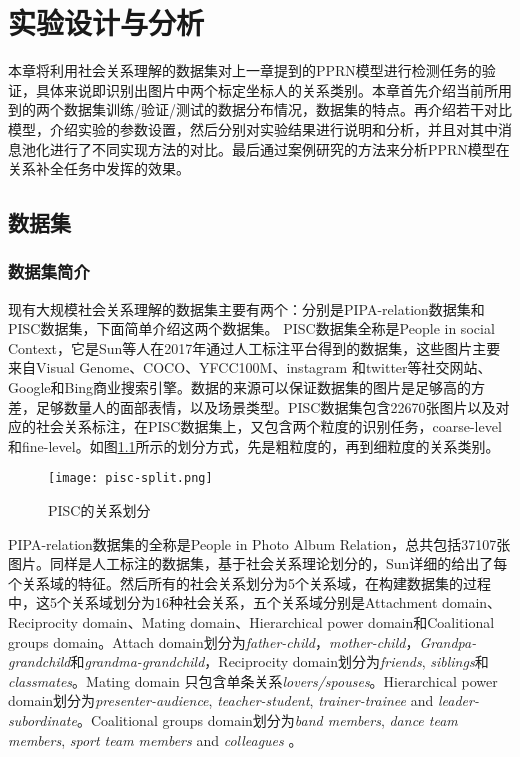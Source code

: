 
\chapter{实验设计与分析}
\label{ch:exp}

本章将利用社会关系理解的数据集对上一章提到的PPRN模型进行检测任务的验证，具体来说即识别出图片中两个标定坐标人的关系类别。本章首先介绍当前所用到的两个数据集训练/验证/测试的数据分布情况，数据集的特点。再介绍若干对比模型，介绍实验的参数设置，然后分别对实验结果进行说明和分析，并且对其中消息池化进行了不同实现方法的对比。最后通过案例研究的方法来分析PPRN模型在关系补全任务中发挥的效果。

\section{数据集}

\subsection{数据集简介}

现有大规模社会关系理解的数据集主要有两个：分别是PIPA-relation\cite{sun2017a}数据集和PISC\cite{li2017dual-glance}数据集，下面简单介绍这两个数据集。
PISC数据集全称是People in social Context，它是Sun等人\cite{sun2017a}在2017年通过人工标注平台得到的数据集，这些图片主要来自Visual Genome\cite{krishna2017visual}、COCO\cite{lin2014microsoft}、YFCC100M\cite{thomee2016yfcc100m:}、instagram 和twitter等社交网站、Google和Bing商业搜索引擎。数据的来源可以保证数据集的图片是足够高的方差，足够数量人的面部表情，以及场景类型。PISC数据集包含22670张图片以及对应的社会关系标注，在PISC数据集上，又包含两个粒度的识别任务，coarse-level和fine-level。如图\ref{fig:exp-pisc-r}所示的划分方式，先是粗粒度的，再到细粒度的关系类别。
\begin{figure}[htpb]
	\centering
	\texttt{[image: pisc-split.png]}
    \caption{PISC的关系划分}
	\vspace*{-3.5mm}
	\label{fig:exp-pisc-r}
\end{figure}

PIPA-relation数据集的全称是People in Photo Album Relation，总共包括37107张图片。同样是人工标注的数据集，基于社会关系理论划分的，Sun\cite{sun2017a}详细的给出了每个关系域的特征。然后所有的社会关系划分为5个关系域，在构建数据集的过程中，这5个关系域划分为16种社会关系，五个关系域分别是Attachment domain、Reciprocity domain、Mating domain、Hierarchical power domain和Coalitional groups domain。Attach domain划分为{\it father-child}，{\it mother-child}，{\it Grandpa-grandchild}和{\it grandma-grandchild}，Reciprocity domain划分为{\it friends}, {\it siblings}和{\it classmates}。Mating domain 只包含单条关系{\it lovers/spouses}。Hierarchical power domain划分为{\it presenter-audience}, {\it teacher-student}, {\it trainer-trainee} and {\it leader-subordinate}。Coalitional groups domain划分为{\it band members}, {\it dance team members}, {\it sport team members} and {\it colleagues} 。

